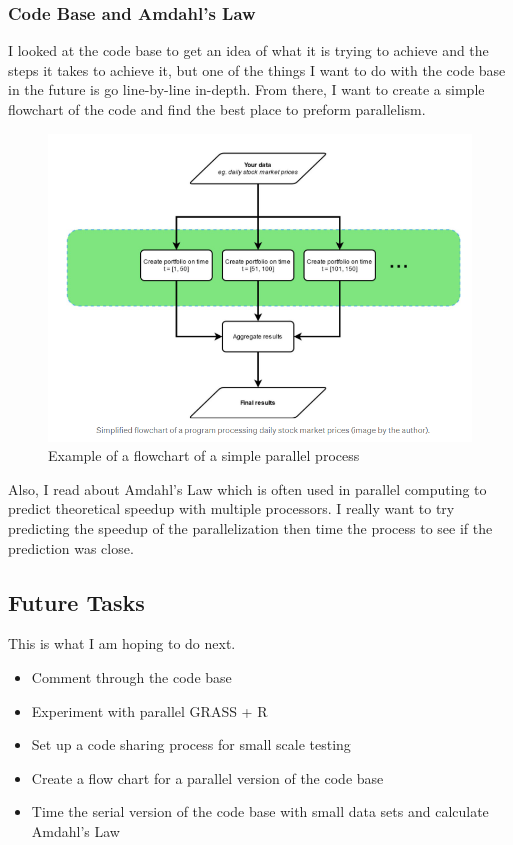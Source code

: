 \documentclass[a4paper,10pt]{article}
\begin{document}
\subsubsection{Code Base and Amdahl's Law}
I looked at the code base to get an idea of what it is trying to achieve and the steps it takes to achieve it, but one of the things I 
want to do with the code base in the future is go line-by-line in-depth. From there, I want to create a simple flowchart of the code and 
find the best place to preform parallelism.
\begin{figure}[h!]
    \caption{Example of a flowchart of a simple parallel process \cite{gera2020}}
    \centering
    \includegraphics[scale=0.3]{flowchart.png}
\end{figure}

Also, I read about Amdahl's Law which is often used in parallel computing to predict theoretical speedup with multiple processors. \cite{hallquist2018}
I really want to try predicting the speedup of the parallelization then time the process to see if the prediction was close.

\subsection{Future Tasks}
This is what I am hoping to do next.
\begin{itemize}
    \item Comment through the code base
    \item Experiment with parallel GRASS + R
    \item Set up a code sharing process for small scale testing
    \item Create a flow chart for a parallel version of the code base
    \item Time the serial version of the code base with small data sets and calculate Amdahl's Law
\end{itemize}
\end{document}
